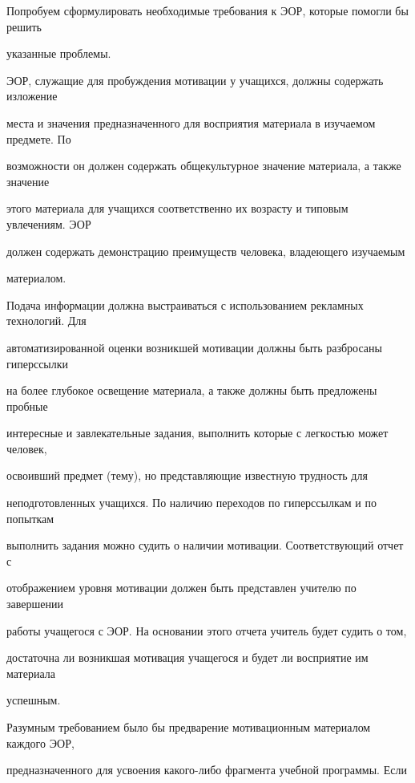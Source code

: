Попробуем сформулировать необходимые требования к ЭОР, которые по\-мог\-ли бы решить 


указанные проблемы.





ЭОР, служащие для пробуждения мотивации у учащихся, должны содержать изложение 


места и значения предназначенного для восприятия материала в изучаемом предмете. По 


возможности он должен содержать общекультурное значение материала, а также значение 


этого материала для учащихся соответственно их возрасту и типовым увлечениям. ЭОР 


должен содержать демонстрацию преимуществ человека, владеющего изучаемым 


материалом.





Подача информации должна выстраиваться с использованием рекламных технологий. Для 


автоматизированной оценки возникшей мотивации должны быть разбросаны гиперссылки 


на более глубокое освещение материала, а также должны быть предложены пробные 


интересные и завлекательные задания, выполнить которые с легкостью может человек, 


освоивший предмет (тему), но представляющие известную трудность для 


неподготовленных учащихся. По наличию переходов по гиперссылкам и по попыткам 


выполнить задания можно судить о наличии мотивации. Соответствующий отчет с 


отображением уровня мотивации должен быть представлен учителю по завершении 


работы учащегося с ЭОР. На основании этого отчета учитель будет судить о том, 


достаточна ли возникшая мотивация учащегося и будет ли восприятие им материала 


успешным.





Разумным требованием было бы предварение мотивационным материалом каждого ЭОР, 


предназначенного для усвоения ка\-ко\-го-ли\-бо фрагмента учебной программы. Если 


